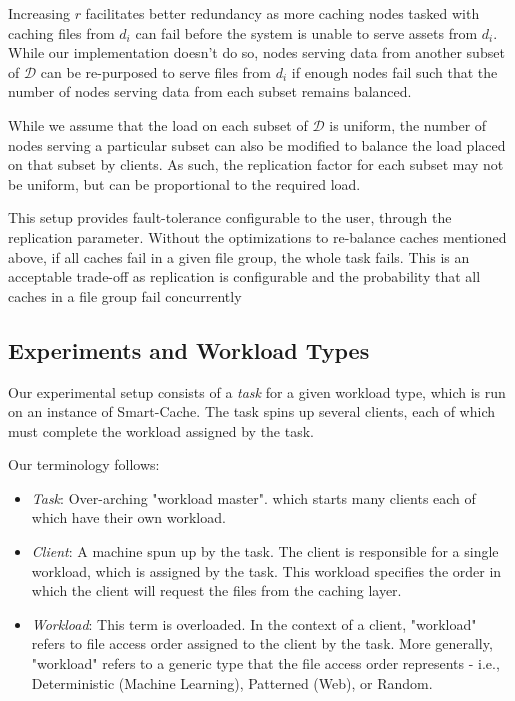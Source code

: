 \documentclass[sigconf]{acmart}
\begin{document}
Increasing $r$ facilitates better redundancy as more caching nodes tasked with caching files from $d_i$ can fail before the system is unable to serve assets from $d_i$. While our implementation doesn't do so, nodes serving data from another subset of $\mathcal{D}$ can be re-purposed to serve files from $d_i$ if enough nodes fail such that the number of nodes serving data from each subset remains balanced.


While we assume that the load on each subset of $\mathcal{D}$ is uniform, the number of nodes serving a particular subset can also be modified to balance the load placed on that subset by clients. As such, the replication factor for each subset may not be uniform, but can be proportional to the required load.


This setup provides fault-tolerance configurable to the user, through the replication parameter. Without the optimizations to re-balance caches mentioned above, if all caches fail in a given file group, the whole task fails. This is an acceptable trade-off as replication is configurable and the probability that all caches in a file group fail concurrently 


\subsection{Experiments and Workload Types}

Our experimental setup consists of a \textit{task} for a given workload type, which is run on an instance of Smart-Cache. The task spins up several clients, each of which must complete the workload assigned by the task. 

Our terminology follows: 
\begin{itemize}
\item \textit{Task}: Over-arching "workload master". which starts many clients each of which have their own workload. 
\item \textit{Client}: A machine spun up by the task. The client is responsible for a single workload, which is assigned by the task. This workload specifies the order in which the client will request the files from the caching layer.
\item \textit{Workload}: This term is overloaded. In the context of a client, "workload" refers to file access order assigned to the client by the task. More generally, "workload" refers to a generic type that the file access order represents - i.e., Deterministic (Machine Learning), Patterned (Web), or Random.
\end{itemize}
\end{document}
